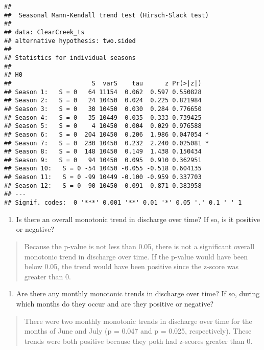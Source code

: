 \documentclass[]{article}
\providecommand{\tightlist}{%
  \setlength{\itemsep}{0pt}\setlength{\parskip}{0pt}}
\begin{document}
\begin{verbatim}
## 
##  Seasonal Mann-Kendall trend test (Hirsch-Slack test)
## 
## data: ClearCreek_ts
## alternative hypothesis: two.sided
## 
## Statistics for individual seasons
## 
## H0
##                      S  varS    tau      z Pr(>|z|)  
## Season 1:   S = 0   64 11154  0.062  0.597 0.550828  
## Season 2:   S = 0   24 10450  0.024  0.225 0.821984  
## Season 3:   S = 0   30 10450  0.030  0.284 0.776650  
## Season 4:   S = 0   35 10449  0.035  0.333 0.739425  
## Season 5:   S = 0    4 10450  0.004  0.029 0.976588  
## Season 6:   S = 0  204 10450  0.206  1.986 0.047054 *
## Season 7:   S = 0  230 10450  0.232  2.240 0.025081 *
## Season 8:   S = 0  148 10450  0.149  1.438 0.150434  
## Season 9:   S = 0   94 10450  0.095  0.910 0.362951  
## Season 10:   S = 0 -54 10450 -0.055 -0.518 0.604135  
## Season 11:   S = 0 -99 10449 -0.100 -0.959 0.337703  
## Season 12:   S = 0 -90 10450 -0.091 -0.871 0.383958  
## ---
## Signif. codes:  0 '***' 0.001 '**' 0.01 '*' 0.05 '.' 0.1 ' ' 1
\end{verbatim}

\begin{enumerate}
\def\labelenumi{\arabic{enumi}.}
\setcounter{enumi}{12}
\tightlist
\item
  Is there an overall monotonic trend in discharge over time? If so, is
  it positive or negative?
\end{enumerate}

\begin{quote}
Because the p-value is not less than 0.05, there is not a significant
overall monotonic trend in discharge over time. If the p-value would
have been below 0.05, the trend would have been positive since the
z-score was greater than 0.
\end{quote}

\begin{enumerate}
\def\labelenumi{\arabic{enumi}.}
\setcounter{enumi}{13}
\tightlist
\item
  Are there any monthly monotonic trends in discharge over time? If so,
  during which months do they occur and are they positive or negative?
\end{enumerate}

\begin{quote}
There were two monthly monotonic trends in discharge over time for the
months of June and July (p = 0.047 and p = 0.025, respectively). These
trends were both positive because they poth had z-scores greater than 0.
\end{quote}
\end{document}
